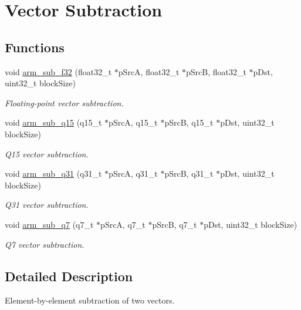 \hypertarget{group___basic_sub}{\section{Vector Subtraction}
\label{group___basic_sub}
}
\subsection*{Functions}
\begin{DoxyCompactItemize}
\item 
void \hyperlink{group___basic_sub_ga7f975a472de286331134227c08aad826}{arm\-\_\-sub\-\_\-f32} (float32\-\_\-t $\ast$p\-Src\-A, float32\-\_\-t $\ast$p\-Src\-B, float32\-\_\-t $\ast$p\-Dst, uint32\-\_\-t block\-Size)
\begin{DoxyCompactList}\small\item\em Floating-\/point vector subtraction. \end{DoxyCompactList}\item 
void \hyperlink{group___basic_sub_ga997a8ee93088d15bda23c325d455b588}{arm\-\_\-sub\-\_\-q15} (q15\-\_\-t $\ast$p\-Src\-A, q15\-\_\-t $\ast$p\-Src\-B, q15\-\_\-t $\ast$p\-Dst, uint32\-\_\-t block\-Size)
\begin{DoxyCompactList}\small\item\em Q15 vector subtraction. \end{DoxyCompactList}\item 
void \hyperlink{group___basic_sub_ga28aa6908d092752144413e21933dc878}{arm\-\_\-sub\-\_\-q31} (q31\-\_\-t $\ast$p\-Src\-A, q31\-\_\-t $\ast$p\-Src\-B, q31\-\_\-t $\ast$p\-Dst, uint32\-\_\-t block\-Size)
\begin{DoxyCompactList}\small\item\em Q31 vector subtraction. \end{DoxyCompactList}\item 
void \hyperlink{group___basic_sub_gab09941de7dfeb247e5c29b406a435fcc}{arm\-\_\-sub\-\_\-q7} (q7\-\_\-t $\ast$p\-Src\-A, q7\-\_\-t $\ast$p\-Src\-B, q7\-\_\-t $\ast$p\-Dst, uint32\-\_\-t block\-Size)
\begin{DoxyCompactList}\small\item\em Q7 vector subtraction. \end{DoxyCompactList}\end{DoxyCompactItemize}


\subsection{Detailed Description}
Element-\/by-\/element subtraction of two vectors.


